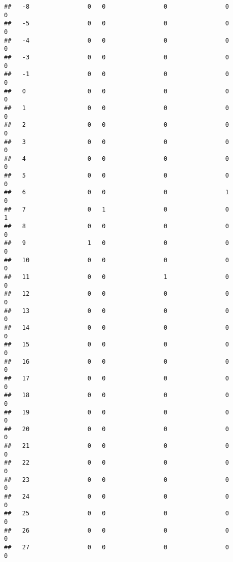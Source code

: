 \documentclass[]{article}
\begin{document}
\begin{verbatim}
##   -8                0   0                0                0                0
##   -5                0   0                0                0                0
##   -4                0   0                0                0                0
##   -3                0   0                0                0                0
##   -1                0   0                0                0                0
##   0                 0   0                0                0                0
##   1                 0   0                0                0                0
##   2                 0   0                0                0                0
##   3                 0   0                0                0                0
##   4                 0   0                0                0                0
##   5                 0   0                0                0                0
##   6                 0   0                0                1                0
##   7                 0   1                0                0                1
##   8                 0   0                0                0                0
##   9                 1   0                0                0                0
##   10                0   0                0                0                0
##   11                0   0                1                0                0
##   12                0   0                0                0                0
##   13                0   0                0                0                0
##   14                0   0                0                0                0
##   15                0   0                0                0                0
##   16                0   0                0                0                0
##   17                0   0                0                0                0
##   18                0   0                0                0                0
##   19                0   0                0                0                0
##   20                0   0                0                0                0
##   21                0   0                0                0                0
##   22                0   0                0                0                0
##   23                0   0                0                0                0
##   24                0   0                0                0                0
##   25                0   0                0                0                0
##   26                0   0                0                0                0
##   27                0   0                0                0                0

\end{verbatim}
\end{document}
